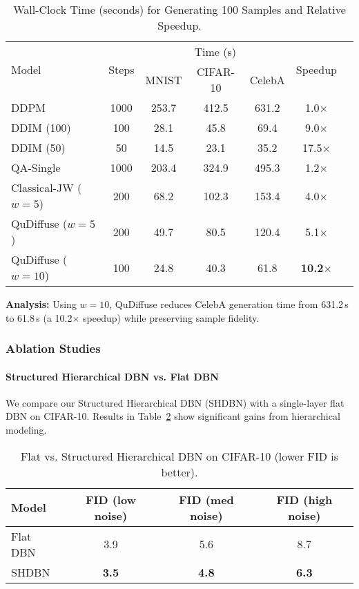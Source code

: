 \documentclass[11pt,letterpaper]{article}
\begin{document}
\begin{table}[H]
\centering
\caption{Wall-Clock Time (seconds) for Generating 100 Samples and Relative Speedup.}
\label{tab:wall-clock}
\begin{tabular}{lcccccc}
\toprule
\multirow{2}{*}{Model} & \multirow{2}{*}{Steps} & \multicolumn{3}{c}{Time (s)} & \multirow{2}{*}{Speedup} \\
\cmidrule(lr){3-5}
 & & MNIST & CIFAR-10 & CelebA &  \\
\midrule
DDPM       & 1000 & 253.7 & 412.5 & 631.2 & 1.0$\times$ \\
DDIM (100) & 100  & 28.1  & 45.8  & 69.4  & 9.0$\times$ \\
DDIM (50)  & 50   & 14.5  & 23.1  & 35.2  & 17.5$\times$ \\
QA-Single  & 1000 & 203.4 & 324.9 & 495.3 & 1.2$\times$ \\
Classical-JW ($w=5$) & 200 & 68.2 & 102.3 & 153.4 & 4.0$\times$ \\
QuDiffuse ($w=5$)    & 200 & 49.7 &  80.5 & 120.4 & 5.1$\times$ \\
QuDiffuse ($w=10$)   & 100 & 24.8 &  40.3 &  61.8 & \textbf{10.2$\times$} \\
\bottomrule
\end{tabular}
\end{table}

\noindent\textbf{Analysis:} Using $w=10$, QuDiffuse reduces CelebA generation time from 631.2\,s to 61.8\,s (a 10.2$\times$ speedup) while preserving sample fidelity.

\subsubsection{Ablation Studies}

\paragraph{Structured Hierarchical DBN vs. Flat DBN}
We compare our Structured Hierarchical DBN (SHDBN) with a single-layer flat DBN on CIFAR-10. Results in Table~\ref{tab:shdbn-ablation} show significant gains from hierarchical modeling.

\begin{table}[H]
\centering
\caption{Flat vs. Structured Hierarchical DBN on CIFAR-10 (lower FID is better).}
\label{tab:shdbn-ablation}
\begin{tabular}{lccc}
\toprule
Model & FID (low noise) & FID (med noise) & FID (high noise) \\
\midrule
Flat DBN & 3.9 & 5.6 & 8.7 \\
SHDBN    & \textbf{3.5} & \textbf{4.8} & \textbf{6.3} \\
\bottomrule
\end{tabular}
\end{table}
\end{document}
